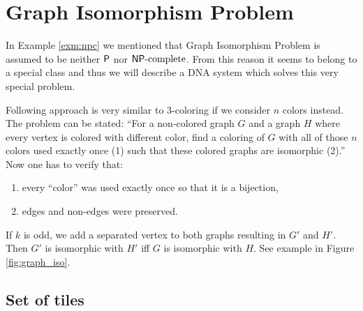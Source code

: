 \section{Graph Isomorphism Problem}

In Example \ref{exm:npc} we mentioned that Graph Isomorphism Problem is assumed to be neither $\P$ nor $\NPC$. From this reason it seems to belong to a special class and thus we will describe a DNA system which solves this very special problem. %

Following approach is very similar to 3-coloring if we consider $n$ colors instead. The problem can be stated: ``For a non-colored graph $G$ and a graph $H$ where every vertex is colored with different color, find a coloring of $G$ with all of those $n$ colors used exactly once (1) such that these colored graphs are isomorphic (2).'' Now one has to verify that:
\begin{enumerate}
	\item every ``color'' was used exactly once so that it is a bijection,
	\item edges and non-edges were preserved.
\end{enumerate}

If $k$ is odd, we add a separated vertex to both graphs resulting in $G'$ and $H'$. Then $G'$ is isomorphic with $H'$ iff $G$ is isomorphic with $H$. See example in Figure \ref{fig:graph_iso}.


\subsection*{Set of tiles}

